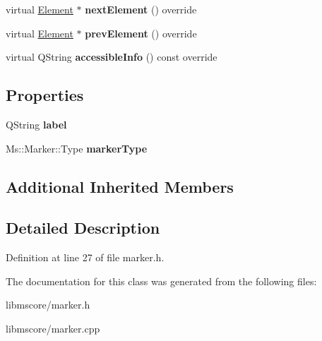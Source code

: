 \begin{DoxyCompactItemize}
\mbox{\label{class_ms_1_1_marker_ae5da545db80e6999d24b8374c826e18d}} 
virtual \hyperlink{class_ms_1_1_element}{Element} $\ast$ {\bfseries next\+Element} () override
\item 
\mbox{\label{class_ms_1_1_marker_ac59ac80d097c9d73fdeacbfbc4bf04fc}} 
virtual \hyperlink{class_ms_1_1_element}{Element} $\ast$ {\bfseries prev\+Element} () override
\item 
\mbox{\label{class_ms_1_1_marker_a4c984b5238233514507bef7840d4d51c}} 
virtual Q\+String {\bfseries accessible\+Info} () const override
\end{DoxyCompactItemize}
\subsection*{Properties}
\begin{DoxyCompactItemize}
\item 
\mbox{\label{class_ms_1_1_marker_a342930c8b026c9e2bc13c01791b5a1f6}} 
Q\+String {\bfseries label}
\item 
\mbox{\label{class_ms_1_1_marker_a1a25c38f33f96785639374ce182b5f56}} 
Ms\+::\+Marker\+::\+Type {\bfseries marker\+Type}
\end{DoxyCompactItemize}
\subsection*{Additional Inherited Members}


\subsection{Detailed Description}


Definition at line 27 of file marker.\+h.



The documentation for this class was generated from the following files\+:\begin{DoxyCompactItemize}
\item 
libmscore/marker.\+h\item 
libmscore/marker.\+cpp\end{DoxyCompactItemize}
